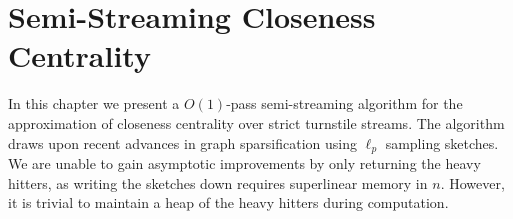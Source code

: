 \documentclass{report}
\begin{document}






\chapter{Semi-Streaming Closeness Centrality} \label{chap:cc}

In this chapter we present a $O(1)$-pass semi-streaming algorithm for the approximation of closeness centrality over strict turnstile streams.
The algorithm draws upon recent advances in graph sparsification using $\ell_p$ sampling sketches.
We are unable to gain asymptotic improvements by only returning the heavy hitters, as writing the sketches down requires superlinear memory in $n$. 
However, it is trivial to maintain a heap of the heavy hitters during computation. 
\end{document}
